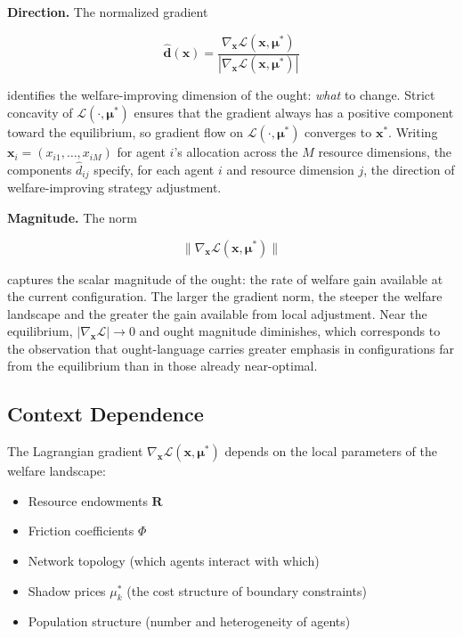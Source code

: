 \documentclass[11pt]{article}
\theoremstyle{plain}
\theoremstyle{definition}
\theoremstyle{remark}
\let\origsubsection\subsection
\renewcommand{\subsection}{\needspace{7\baselineskip}\origsubsection}
\providecommand{\tightlist}{%
  \setlength{\itemsep}{0pt}\setlength{\parskip}{0pt}}
\begin{document}
\textbf{Direction.} The normalized gradient

\[\hat{\mathbf{d}}(\mathbf{x}) = \frac{\nabla_{\mathbf{x}} \mathcal{L}(\mathbf{x}, \boldsymbol{\mu}^*)}{|\nabla_{\mathbf{x}} \mathcal{L}(\mathbf{x}, \boldsymbol{\mu}^*)|}\]

identifies the welfare-improving dimension of the ought: \emph{what} to
change. Strict concavity of \(\mathcal{L}(\cdot, \boldsymbol{\mu}^*)\)
ensures that the gradient always has a positive component toward the
equilibrium, so gradient flow on
\(\mathcal{L}(\cdot, \boldsymbol{\mu}^*)\) converges to
\(\mathbf{x}^*\). Writing \(\mathbf{x}_i = (x_{i1}, \ldots, x_{iM})\)
for agent \(i\)'s allocation across the \(M\) resource dimensions, the
components \(\hat{d}_{ij}\) specify, for each agent \(i\) and resource
dimension \(j\), the direction of welfare-improving strategy adjustment.

\textbf{Magnitude.} The norm

\[\|\nabla_{\mathbf{x}} \mathcal{L}(\mathbf{x}, \boldsymbol{\mu}^*)\|\]

captures the scalar magnitude of the ought: the rate of welfare gain
available at the current configuration. The larger the gradient norm,
the steeper the welfare landscape and the greater the gain available
from local adjustment. Near the equilibrium,
\(|\nabla_{\mathbf{x}} \mathcal{L}| \to 0\) and ought magnitude
diminishes, which corresponds to the observation that ought-language
carries greater emphasis in configurations far from the equilibrium than
in those already near-optimal.

\subsection{Context Dependence}\label{context-dependence}

The Lagrangian gradient
\(\nabla_{\mathbf{x}} \mathcal{L}(\mathbf{x}, \boldsymbol{\mu}^*)\)
depends on the local parameters of the welfare landscape:

\begin{itemize}
\tightlist
\item
  Resource endowments \(\mathbf{R}\)
\item
  Friction coefficients \(\Phi\)
\item
  Network topology (which agents interact with which)
\item
  Shadow prices \(\mu_k^*\) (the cost structure of boundary constraints)
\item
  Population structure (number and heterogeneity of agents)
\end{itemize}
\end{document}
